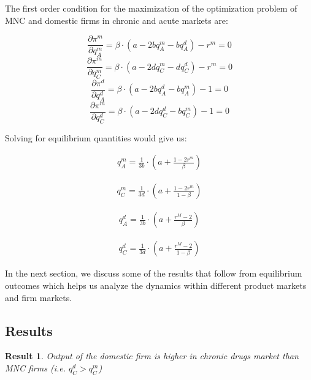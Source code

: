 \documentclass[AER]{AEA}
\theoremstyle{theorem}
\newtheorem{res}{Result}
\begin{document}
The first order condition for the maximization of the optimization problem of MNC and domestic firms in chronic and acute markets are:

\[ \frac{\partial \pi^{m}}{\partial q_{A}^{m}} = \beta \cdot(a- 2bq_{A}^{m} - bq_{A}^{d}) - r^{m} = 0  \]
\[\frac{\partial \pi^{m}}{\partial q_{C}^{m}} = \beta \cdot(a- 2dq_{C}^{m} - dq_{C}^{d}) - r^{m} = 0   \] 
\[ \frac{\partial \pi^{d}}{\partial q_{A}^{d}} = \beta \cdot(a- 2bq_{A}^{d} - bq_{A}^{m}) - 1 = 0  \]
\[ \frac{\partial \pi^{m}}{\partial q_{C}^{d}} = \beta \cdot(a- 2dq_{C}^{d} - bq_{C}^{m}) - 1 = 0  \]

Solving for equilibrium quantities would give us:

\begin{equation}
	\begin{aligned}
	 q_{A}^{m} = \frac{1}{3b}\cdot \left( a + \frac{1 - 2r^{m}}{\beta} \right)
	\end{aligned}
\end{equation}

\begin{equation}
	\begin{aligned}
		q_{C}^{m} = \frac{1}{3d}\cdot \left( a + \frac{1 - 2r^{m}}{1 - \beta} \right)
	\end{aligned}
\end{equation}

\begin{equation}
	\begin{aligned}
		q_{A}^{d} = \frac{1}{3b}\cdot \left( a + \frac{r^{M} - 2}{\beta} \right)
	\end{aligned}
\end{equation}

\begin{equation}
	\begin{aligned}
		q_{C}^{d} = \frac{1}{3d}\cdot \left( a + \frac{r^{M} - 2}{1 - \beta} \right)
	\end{aligned}
\end{equation}

In the next section, we discuss some of the results that follow from equilibrium outcomes which helps us analyze the dynamics within different product markets and firm markets.



\subsection{Results}

\begin{res}
Output of the domestic firm  is higher in chronic drugs market than MNC firms (i.e. $q_{C}^{d} > q_{C}^{m}$)
\end{res}
\end{document}
